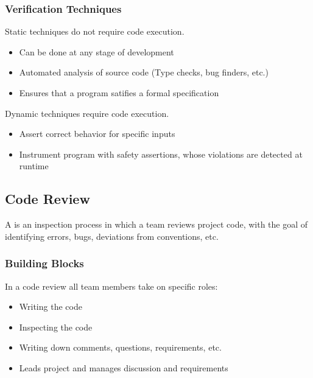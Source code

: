 \documentclass[
    ../../Software_Engineering_Summary.tex,
]
{subfiles}
\begin{document}
\subsubsection{Verification Techniques}
\begin{defbox}
    [Static]
    Static techniques do not require code execution.
    \begin{itemize}
        \item {} Can be done at any stage of development
        \item {} Automated analysis of source code (Type checks, bug finders, etc.)
        \item {} Ensures that a program satifies a formal specification
    \end{itemize}
\end{defbox}

\begin{defbox}
    [Dynamic]
    Dynamic techniques require code execution.
    \begin{itemize}
        \item {} Assert correct behavior for specific inputs
        \item {} Instrument program with safety assertions, whose violations are detected at runtime 
    \end{itemize}
\end{defbox}

\subsection{Code Review}
\begin{defbox*}
    A  is an inspection process in which a team reviews project code, with the goal of identifying errors, bugs, deviations from conventions, etc.
\end{defbox*}

\subsubsection{Building Blocks}
In a code review all team members take on specific roles:
\begin{itemize}
    \item {} Writing the code
    \item {} Inspecting the code
    \item {} Writing down comments, questions, requirements, etc.
    \item {} Leads project and manages discussion and requirements
\end{itemize}
\end{document}
